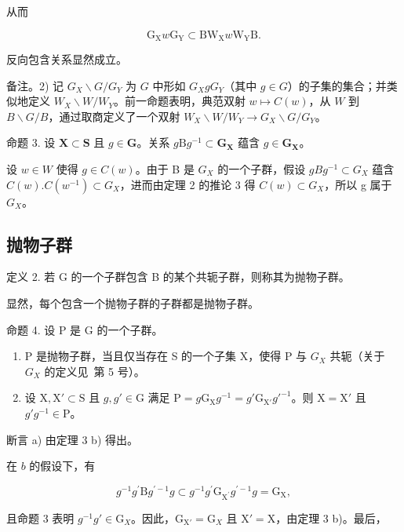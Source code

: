 从而

\[
\mathrm{G} _ {\mathrm{X}} w \mathrm{G} _ {\mathrm{Y}} \subset \mathrm{BW} _ {\mathrm{X}} w \mathrm{W} _ {\mathrm{Y}} \mathrm{B}.
\]

反向包含关系显然成立。

备注。2) 记 \(G_X \backslash G / G_Y\) 为 \(G\) 中形如 \(G_X gG_Y\)（其中 \(g \in G\)）的子集的集合；并类似地定义 \(W_X \backslash W / W_Y\)。前一命题表明，典范双射 \(w \mapsto C(w)\)，从 \(W\) 到 \(B \backslash G / B\)，通过取商定义了一个双射 \(W_X \backslash W / W_Y \to G_X \backslash G / G_Y\)。

命题 3. 设 \(\mathbf{X} \subset \mathbf{S}\) 且 \(g \in \mathbf{G}\)。关系 \(g\mathrm{B}g^{-1} \subset \mathbf{G}_{\mathbf{X}}\) 蕴含 \(g \in \mathbf{G}_{\mathbf{X}}\)。

设 \(w \in W\) 使得 \(g \in C(w)\)。由于 B 是 \(G_X\) 的一个子群，假设 \(gBg^{-1} \subset G_X\) 蕴含 \(C(w).C(w^{-1}) \subset G_X\)，进而由定理 2 的推论 3 得 \(C(w) \subset G_X\)，所以 g 属于 \(G_X\)。

\subsection{抛物子群}

定义 2. 若 G 的一个子群包含 B 的某个共轭子群，则称其为抛物子群。

显然，每个包含一个抛物子群的子群都是抛物子群。

命题 4. 设 P 是 G 的一个子群。

\begin{enumerate}
\def\labelenumi{\alph{enumi})}
\item
  P 是抛物子群，当且仅当存在 S 的一个子集 X，使得 P 与 \(G_{X}\) 共轭（关于 \(G_{X}\) 的定义见~第 5 号）。
\item
  设 \(\mathrm{X}, \mathrm{X}' \subset \mathrm{S}\) 且 \(g, g' \in \mathrm{G}\) 满足 \(\mathrm{P} = g\mathrm{G}_{\mathrm{X}}g^{-1} = g'\mathrm{G}_{\mathrm{X}'}g'^{-1}\)。则 \(\mathrm{X} = \mathrm{X}'\) 且 \(g'g^{-1} \in \mathrm{P}\)。
\end{enumerate}

断言 a) 由定理 3 b) 得出。

在 \(b\) 的假设下，有

\[
g ^ {- 1} g ^ {\prime} \mathrm{B} g ^ {\prime - 1} g \subset g ^ {- 1} g ^ {\prime} \mathrm{G} _ {\mathrm{X} ^ {\prime}} g ^ {\prime - 1} g = \mathrm{G} _ {\mathrm{X}},
\]

且命题 3 表明 \(g^{-1}g' \in \mathrm{G}_X\)。因此，\(\mathrm{G}_{\mathrm{X}'} = \mathrm{G}_X\) 且 \(\mathrm{X}' = \mathrm{X}\)，由定理 3 b)。最后，

